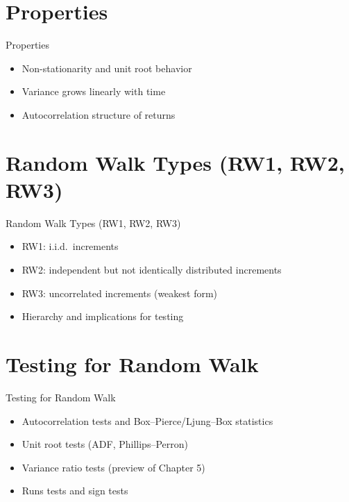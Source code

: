 \documentclass[9pt, aspectratio=169, t]{beamer}
\theoremstyle{definition}
\begin{document}
\section{Properties}

\begin{frame}{Properties}
    \begin{itemize}
        \item Non-stationarity and unit root behavior
        \item Variance grows linearly with time
        \item Autocorrelation structure of returns
    \end{itemize}
\end{frame}

\section{Random Walk Types (RW1, RW2, RW3)}

\begin{frame}{Random Walk Types (RW1, RW2, RW3)}
    \begin{itemize}
        \item RW1: i.i.d.\ increments
        \item RW2: independent but not identically distributed increments
        \item RW3: uncorrelated increments (weakest form)
        \item Hierarchy and implications for testing
    \end{itemize}
\end{frame}

\section{Testing for Random Walk}

\begin{frame}{Testing for Random Walk}
    \begin{itemize}
        \item Autocorrelation tests and Box--Pierce/Ljung--Box statistics
        \item Unit root tests (ADF, Phillips--Perron)
        \item Variance ratio tests (preview of Chapter 5)
        \item Runs tests and sign tests
    \end{itemize}
\end{frame}
\end{document}
